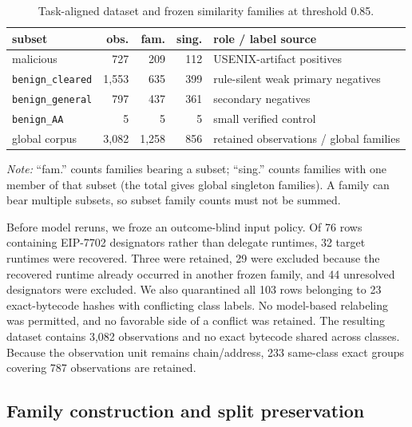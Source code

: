 \documentclass[conference]{IEEEtran}
\begin{document}
\begin{table}[t]
  \centering
  \caption{Task-aligned dataset and frozen similarity families at threshold 0.85.}
  \label{tab:dataset-composition}
  \footnotesize
  \setlength{\tabcolsep}{2.3pt}
  \begin{tabular}{@{}p{1.45cm}rrrp{2.25cm}@{}}
    \toprule
    subset & obs. & fam. & sing. & role / label source \\
    \midrule
    malicious & 727 & 209 & 112 & USENIX-artifact positives \\
    \texttt{benign\_cleared} & 1,553 & 635 & 399 & rule-silent weak primary negatives \\
    \texttt{benign\_general} & 797 & 437 & 361 & secondary negatives \\
    \texttt{benign\_AA} & 5 & 5 & 5 & small verified control \\
    \midrule
    global corpus & 3,082 & 1,258 & 856 & retained observations / global families \\
    \bottomrule
  \end{tabular}
  \vspace{2pt}

  \parbox{\columnwidth}{\footnotesize \emph{Note:} ``fam.'' counts families bearing a subset; ``sing.'' counts families with one member of that subset (the total gives global singleton families). A family can bear multiple subsets, so subset family counts must not be summed.}
\end{table}

Before model reruns, we froze an outcome-blind input policy. Of 76 rows containing EIP-7702 designators rather than delegate runtimes, 32 target runtimes were recovered. Three were retained, 29 were excluded because the recovered runtime already occurred in another frozen family, and 44 unresolved designators were excluded. We also quarantined all 103 rows belonging to 23 exact-bytecode hashes with conflicting class labels. No model-based relabeling was permitted, and no favorable side of a conflict was retained. The resulting dataset contains 3,082 observations and no exact bytecode shared across classes. Because the observation unit remains chain/address, 233 same-class exact groups covering 787 observations are retained.

\subsection{Family construction and split preservation}
\end{document}
